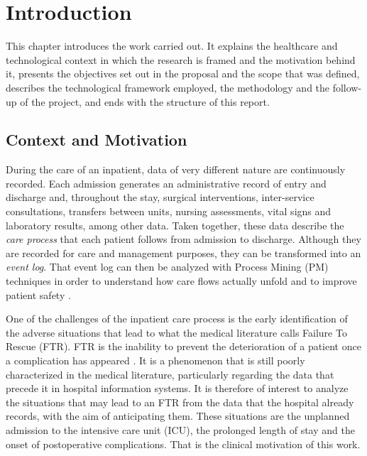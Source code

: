 \chapter{Introduction}
\label{cap:introduccion}

This chapter introduces the work carried out. It explains the healthcare and technological context in which the research is framed and the motivation behind it, presents the objectives set out in the proposal and the scope that was defined, describes the technological framework employed, the methodology and the follow-up of the project, and ends with the structure of this report.

\section{Context and Motivation}
\label{sec:contexto}

During the care of an inpatient, data of very different nature are continuously recorded. Each admission generates an administrative record of entry and discharge and, throughout the stay, surgical interventions, inter-service consultations, transfers between units, nursing assessments, vital signs and laboratory results, among other data. Taken together, these data describe the \emph{care process} that each patient follows from admission to discharge. Although they are recorded for care and management purposes, they can be transformed into an \emph{event log}. That event log can then be analyzed with Process Mining (PM) techniques in order to understand how care flows actually unfold and to improve patient safety \cite{aalst2016}.

One of the challenges of the inpatient care process is the early identification of the adverse situations that lead to what the medical literature calls Failure To Rescue (FTR). FTR is the inability to prevent the deterioration of a patient once a complication has appeared \cite{silber1992}. It is a phenomenon that is still poorly characterized in the medical literature, particularly regarding the data that precede it in hospital information systems. It is therefore of interest to analyze the situations that may lead to an FTR from the data that the hospital already records, with the aim of anticipating them. These situations are the unplanned admission to the intensive care unit (ICU), the prolonged length of stay and the onset of postoperative complications. That is the clinical motivation of this work.

